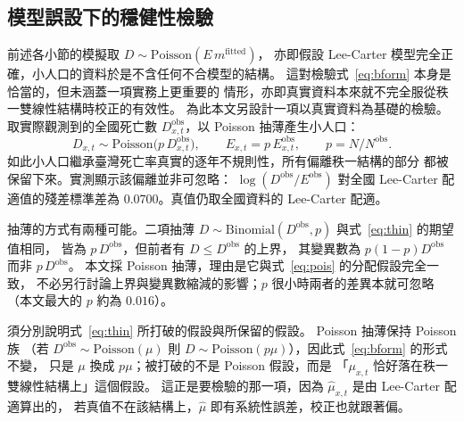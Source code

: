 \documentclass[UTF8, fontset=macnew, a4paper, 12pt]{ctexart}
\begin{document}
\subsection{模型誤設下的穩健性檢驗}\label{sec:real}

前述各小節的模擬取 $D\sim\text{Poisson}(E\,m^{\text{fitted}})$，
亦即假設 Lee-Carter 模型完全正確，小人口的資料於是不含任何不合模型的結構。
這對檢驗式~\eqref{eq:bform} 本身是恰當的，但未涵蓋一項實務上更重要的
情形，亦即真實資料本來就不完全服從秩一雙線性結構時校正的有效性。
為此本文另設計一項以真實資料為基礎的檢驗。取實際觀測到的全國死亡數
$D^{\text{obs}}_{x,t}$，以 Poisson 抽薄產生小人口：
\begin{equation}\label{eq:thin}
D_{x,t}\sim\text{Poisson}\big(p\,D^{\text{obs}}_{x,t}\big),\qquad
E_{x,t}=p\,E^{\text{obs}}_{x,t},\qquad p=N/N^{\text{obs}} .
\end{equation}
如此小人口繼承臺灣死亡率真實的逐年不規則性，所有偏離秩一結構的部分
都被保留下來。實測顯示該偏離並非可忽略：
$\log(D^{\text{obs}}/E^{\text{obs}})$ 對全國 Lee-Carter 配適值的殘差標準差為
$0.0700$。真值仍取全國資料的 Lee-Carter 配適。

抽薄的方式有兩種可能。二項抽薄
$D\sim\text{Binomial}(D^{\text{obs}},p)$ 與式~\eqref{eq:thin} 的期望值相同，
皆為 $p\,D^{\text{obs}}$，但前者有 $D\le D^{\text{obs}}$ 的上界，
其變異數為 $p(1-p)D^{\text{obs}}$ 而非 $p\,D^{\text{obs}}$。
本文採 Poisson 抽薄，理由是它與式~\eqref{eq:pois} 的分配假設完全一致，
不必另行討論上界與變異數縮減的影響；$p$ 很小時兩者的差異本就可忽略
（本文最大的 $p$ 約為 $0.016$）。

須分別說明式~\eqref{eq:thin} 所打破的假設與所保留的假設。 Poisson 抽薄保持 Poisson 族
（若 $D^{\text{obs}}\sim\text{Poisson}(\mu)$ 則
$D\sim\text{Poisson}(p\mu)$），因此式~\eqref{eq:bform} 的形式不變，
只是 $\mu$ 換成 $p\mu$；被打破的不是 Poisson 假設，而是
「$\mu_{x,t}$ 恰好落在秩一雙線性結構上」這個假設。
這正是要檢驗的那一項，因為 $\hat\mu_{x,t}$ 是由 Lee-Carter 配適算出的，
若真值不在該結構上，$\hat\mu$ 即有系統性誤差，校正也就跟著偏。
\end{document}

